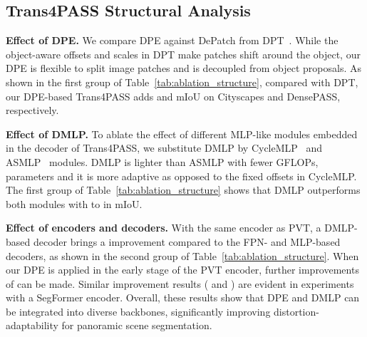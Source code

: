 \documentclass[final]{cvpr}
\begin{document}
\subsection{Trans4PASS Structural Analysis}
\noindent\textbf{Effect of DPE.}
We compare DPE against DePatch from DPT~\cite{chen2021dpt}. 
While the object-aware offsets and scales in DPT make patches shift around the object, our DPE is flexible to split image patches and is decoupled from object proposals.
As shown in the first group of Table~\ref{tab:ablation_structure}, compared with DPT, our DPE-based Trans4PASS adds  and  mIoU on Cityscapes and DensePASS, respectively.

\noindent\textbf{Effect of DMLP.}
To ablate the effect of different MLP-like modules embedded in the decoder of Trans4PASS, we substitute DMLP by CycleMLP~\cite{cyclemlp} and ASMLP~\cite{asmlp} modules. DMLP is lighter than ASMLP with fewer GFLOPs, parameters and it is more adaptive as opposed to the fixed offsets in CycleMLP. The first group of Table~\ref{tab:ablation_structure} shows that DMLP outperforms both modules with  to  in mIoU.

\noindent\textbf{Effect of encoders and decoders.}
With the same encoder as PVT, a DMLP-based decoder brings a  improvement compared to the FPN- and MLP-based decoders, as shown in the second group of Table~\ref{tab:ablation_structure}. When our DPE is applied in the early stage of the PVT encoder, further improvements of  can be made. Similar improvement results ( and ) are evident in experiments with a SegFormer encoder.
Overall, these results show that DPE and DMLP can be integrated into diverse backbones, significantly improving distortion-adaptability for panoramic scene segmentation.
\end{document}
